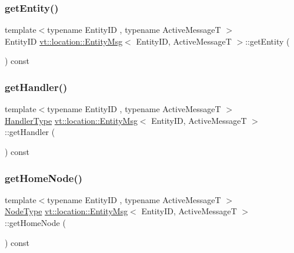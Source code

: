 \subsubsection{\texorpdfstring{get\+Entity()}{getEntity()}}
{\footnotesize\ttfamily template$<$typename Entity\+ID , typename Active\+MessageT $>$ \\
Entity\+ID \hyperlink{structvt_1_1location_1_1_entity_msg}{vt\+::location\+::\+Entity\+Msg}$<$ Entity\+ID, Active\+MessageT $>$\+::get\+Entity (\begin{DoxyParamCaption}{ }\end{DoxyParamCaption}) const\hspace{0.3cm}{\ttfamily [inline]}}

\mbox{\label{structvt_1_1location_1_1_entity_msg_ab373f1520ac7374900bbea1026372b8e}} 
\subsubsection{\texorpdfstring{get\+Handler()}{getHandler()}}
{\footnotesize\ttfamily template$<$typename Entity\+ID , typename Active\+MessageT $>$ \\
\hyperlink{namespacevt_af64846b57dfcaf104da3ef6967917573}{Handler\+Type} \hyperlink{structvt_1_1location_1_1_entity_msg}{vt\+::location\+::\+Entity\+Msg}$<$ Entity\+ID, Active\+MessageT $>$\+::get\+Handler (\begin{DoxyParamCaption}{ }\end{DoxyParamCaption}) const\hspace{0.3cm}{\ttfamily [inline]}}

\mbox{\label{structvt_1_1location_1_1_entity_msg_a5f0675e4fca11168fee86e8af122e289}} 
\subsubsection{\texorpdfstring{get\+Home\+Node()}{getHomeNode()}}
{\footnotesize\ttfamily template$<$typename Entity\+ID , typename Active\+MessageT $>$ \\
\hyperlink{namespacevt_a866da9d0efc19c0a1ce79e9e492f47e2}{Node\+Type} \hyperlink{structvt_1_1location_1_1_entity_msg}{vt\+::location\+::\+Entity\+Msg}$<$ Entity\+ID, Active\+MessageT $>$\+::get\+Home\+Node (\begin{DoxyParamCaption}{ }\end{DoxyParamCaption}) const\hspace{0.3cm}{\ttfamily [inline]}}


